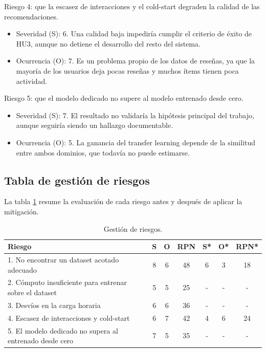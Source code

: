 \documentclass[
11pt, %
]{charter}
\begin{document}
Riesgo 4: que la escasez de interacciones y el cold-start degraden la calidad de las recomendaciones.
\begin{itemize}
  \item Severidad (S): 6. Una calidad baja impediría cumplir el criterio de éxito de HU3, aunque no detiene el desarrollo del resto del sistema.
  \item Ocurrencia (O): 7. Es un problema propio de los datos de reseñas, ya que la mayoría de los usuarios deja pocas reseñas y muchos ítems tienen poca actividad.
\end{itemize}

Riesgo 5: que el modelo dedicado no supere al modelo entrenado desde cero.
\begin{itemize}
  \item Severidad (S): 7. El resultado no validaría la hipótesis principal del trabajo, aunque seguiría siendo un hallazgo documentable.
  \item Ocurrencia (O): 5. La ganancia del transfer learning depende de la similitud entre ambos dominios, que todavía no puede estimarse.
\end{itemize}

\subsection{Tabla de gestión de riesgos}

La tabla \ref{tab:riesgos} resume la evaluación de cada riesgo antes y después de aplicar la mitigación.

\begin{table}[H]
\centering
\caption{Gestión de riesgos.}
\label{tab:riesgos}
\begin{tabularx}{\linewidth}{@{}|X|c|c|c|c|c|c|@{}}
\hline
\rowcolor[HTML]{C0C0C0}
Riesgo & S & O & RPN & S* & O* & RPN* \\ \hline
1. No encontrar un dataset acotado adecuado & 8 & 6 & 48 & 6 & 3 & 18 \\ \hline
2. Cómputo insuficiente para entrenar sobre el dataset & 5 & 5 & 25 & - & - & - \\ \hline
3. Desvíos en la carga horaria & 6 & 6 & 36 & - & - & - \\ \hline
4. Escasez de interacciones y cold-start & 6 & 7 & 42 & 4 & 6 & 24 \\ \hline
5. El modelo dedicado no supera al entrenado desde cero & 7 & 5 & 35 & - & - & - \\ \hline
\end{tabularx}
\end{table}
\end{document}
